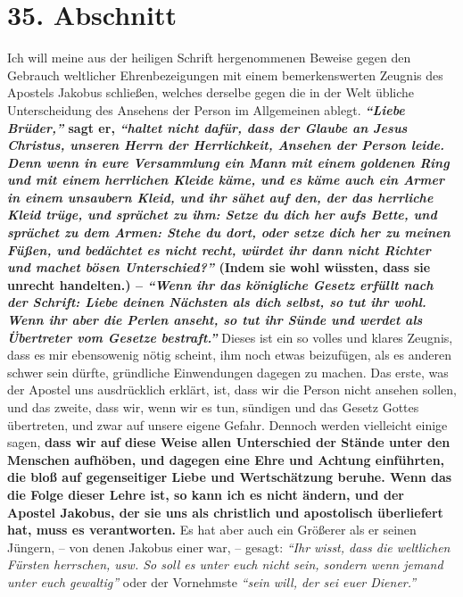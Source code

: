 \section{35. Abschnitt} \label{kap9_ab35}

Ich will meine aus der heiligen Schrift hergenommenen Beweise gegen den Gebrauch
weltlicher Ehrenbezeigungen mit einem bemerkenswerten Zeugnis des Apostels
Jakobus schließen, welches derselbe gegen die in der Welt übliche Unterscheidung
des Ansehens der Person im Allgemeinen ablegt. 
\textbf{\textit{"`Liebe Brüder,"'} sagt er,
\textit{"`haltet nicht dafür, dass der Glaube an Jesus Christus, unseren Herrn
der
Herrlichkeit, Ansehen der Person leide. Denn wenn in eure Versammlung ein Mann
mit einem goldenen Ring und mit einem herrlichen Kleide käme, und es käme auch
ein Armer in einem unsaubern Kleid, und ihr sähet auf den, der das herrliche
Kleid trüge, und sprächet zu ihm: Setze du dich her aufs Bette, und sprächet zu
dem Armen: Stehe du dort, oder setze dich her zu meinen Füßen, und bedächtet es
nicht recht, würdet ihr dann nicht Richter und machet bösen Unterschied?"'}
(Indem sie wohl wüssten, dass sie unrecht handelten.) --\textit{ "`Wenn ihr das
königliche
Gesetz erfüllt nach der Schrift: Liebe deinen Nächsten als dich selbst, so tut
ihr wohl. Wenn ihr aber die Perlen anseht, so tut ihr Sünde und werdet
als Übertreter vom Gesetze bestraft."'}}
Dieses ist
ein so volles und klares Zeugnis, dass es mir ebensowenig nötig scheint, ihm
noch etwas beizufügen, als es anderen schwer sein dürfte, gründliche
Einwendungen
dagegen zu machen. Das erste, was der Apostel uns ausdrücklich erklärt, ist,
dass
wir die Person nicht ansehen sollen, und das zweite, dass wir, wenn wir es tun,
sündigen und das Gesetz Gottes übertreten, und zwar auf unsere eigene Gefahr.
Dennoch werden vielleicht einige sagen, \label{ref:09_35_staende_abschaffen}
\textbf{dass wir auf diese Weise allen
Unterschied der Stände unter den Menschen aufhöben, und dagegen eine Ehre und
Achtung einführten, die bloß auf gegenseitiger Liebe und Wertschätzung beruhe.
Wenn das die Folge dieser Lehre ist, so kann ich es nicht ändern, und der
Apostel Jakobus, der sie uns als christlich und apostolisch überliefert hat,
muss es verantworten.} Es hat aber auch ein Größerer als er seinen Jüngern, --
von denen Jakobus einer war, -- gesagt:
\textit{"`Ihr wisst, dass die weltlichen Fürsten
herrschen, usw. So soll es unter euch nicht sein, sondern wenn jemand unter
euch gewaltig"'} oder der Vornehmste \textit{"`sein will, der sei euer
Diener."'}
